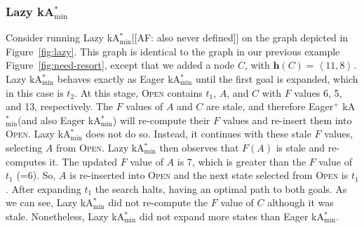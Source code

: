 \documentclass[twoside,11pt]{article}
\newcommand{\kastarvar}[1]{\textup{kA}$^*_{#1}$\xspace}
\newcommand{\kastarmin}{\kastarvar{\min}}
\newcommand{\tuple}[1]{\ensuremath{\left \langle #1 \right \rangle }}
\newcommand{\open}{\textsc{Open}\xspace}
\newcommand{\vect}[1]{\mathbf{#1}}
\begin{document}

\subsubsection{Lazy \kastarmin}

Consider running Lazy \kastarmin [[AF: also never defined]] on the graph depicted in Figure~\ref{fig:lazy}.
This graph is identical to the graph in our previous example Figure~\ref{fig:need-resort}, except that we added a node $C$, with $\vect{h}(C)= \tuple{11, 8}$.
Lazy \kastarmin behaves exactly as Eager \kastarmin until the first goal is expanded, which in this case is $t_2$.
At this stage, \open contains $t_1$, $A$, and $C$ with $F$ values 6, 5, and 13, respectively.
The $F$ values of $A$ and $C$ are stale, and therefore Eager$^+$ \kastarmin (and also Eager \kastarmin) will re-compute their $F$ values and re-insert them into \open.
Lazy \kastarmin does not do so.
Instead, it continues with these stale $F$ values, selecting $A$ from \open.
Lazy \kastarmin  then observes that $F(A)$ is stale and re-computes it.
The updated $F$ value of $A$ is 7, which is greater than the $F$ value of $t_1$ (=6).
So, $A$ is re-inserted into \open and the next state selected from \open is $t_1$.
After expanding $t_1$ the search halts, having an optimal path to both goals.
As we can see, Lazy \kastarmin did not re-compute the $F$ value of $C$ although it was stale.
Nonetheless, Lazy \kastarmin did not expand more states than Eager \kastarmin.
\end{document}
